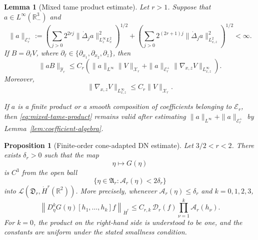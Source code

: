 \documentclass[10pt,a4paper]{amsart}
\newtheorem{lemma}{Lemma}
\newtheorem{proposition}{Proposition}
\newcommand{\R}{\mathbb{R}}
\begin{document}
\begin{lemma}[Mixed tame product estimate]
\label{lem:mixed-tame-product}
Let \(r>1\).
Suppose that \(a\in L^\infty(\R^3_-)\) and
\[
 \|a\|_{\mathcal E_r^+} := \left( \sum_{j>0} 2^{2rj} \|\dot\Delta_ja\|_{L^\infty_zL^2_x}^2 \right)^{1/2} + \left( \sum_{j>0} 2^{(2r+1)j} \|\dot\Delta_ja\|_{L^2_{x,z}}^2 \right)^{1/2} <\infty.
\]
If \(B=\partial_\ell V\), where
\(\partial_\ell\in
\{\partial_{x_1},\partial_{x_2},\partial_z\}\), then
\begin{equation}
\label{eq:mixed-tame-product}
 \|aB\|_{\mathcal Y_r} \leq C_r \left( \|a\|_{L^\infty}\|V\|_{\mathcal X_r} + \|a\|_{\mathcal E_r^+} \|\nabla_{x,z}V\|_{L^\infty_{x,z}} \right).
\end{equation}
Moreover,
\begin{equation}
\label{eq:X-to-Linfty}
 \|\nabla_{x,z}V\|_{L^\infty_{x,z}} \leq C_r\|V\|_{\mathcal X_r}.
\end{equation}

If \(a\) is a finite product or a smooth composition of coefficients belonging to \(\mathcal E_r\), then \eqref{eq:mixed-tame-product} remains valid after estimating \(\|a\|_{L^\infty}+\|a\|_{\mathcal E_r^+}\) by Lemma~\ref{lem:coefficient-algebra}.
\end{lemma}

\begin{proposition}[Finite-order cone-adapted DN estimate]
\label{prop:finite-order-DN}
Let \(3/2<r<2\).
There exists \(\delta_r>0\) such that the map
\[
 \eta\longmapsto G(\eta)
\]
is \(C^3\) from the open ball
\[
 \{\eta\in\mathfrak A_r:\mathcal A_r(\eta)<2\delta_r\}
\]
into \(\mathcal L(\mathfrak D_r,\dot H^r(\R^2))\).
More precisely, whenever \(\mathcal A_r(\eta)\leq\delta_r\) and
\(k=0,1,2,3\),
\begin{equation}
\label{eq:finite-order-DN}
 \left\| D_\eta^kG(\eta)[h_1,\ldots,h_k]f \right\|_{\dot H^r} \leq C_{r,k}\, \mathcal D_r(f) \prod_{\nu=1}^k\mathcal A_r(h_\nu).
\end{equation}
For \(k=0\), the product on the right-hand side is understood to be one, and the constants are uniform under the stated smallness condition.
\end{proposition}
\end{document}
